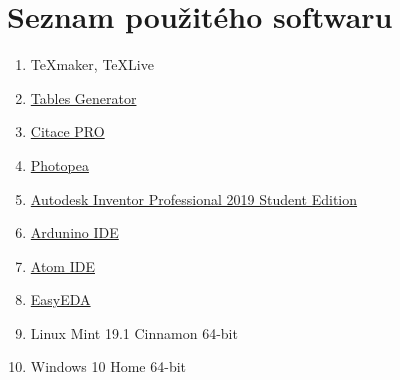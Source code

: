 \clearpage
\section{Seznam použitého softwaru}
\begin{enumerate}%
	\item \TeX maker, \TeX Live
	\item \href{https://www.tablesgenerator.com/latex_tables}{Tables Generator}
	\item \href{https://www.citace.com/citace-pro}{Citace PRO}
	\item \href{https://www.photopea.com}{Photopea}
	\item \href{https://www.autodesk.cz/products/inventor/overview}{Autodesk Inventor Professional 2019 Student Edition}
	\item \href{https://arduino.cc}{Ardunino IDE}
	\item \href{https://atom.io}{Atom IDE}
	\item \href{https://easyeda.com/}{EasyEDA}
	\item Linux Mint 19.1 Cinnamon 64-bit
	\item Windows 10 Home 64-bit
\end{enumerate}
